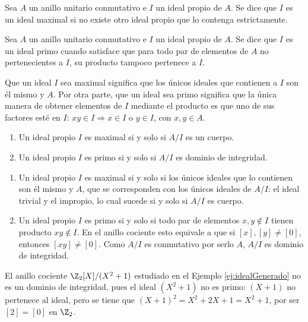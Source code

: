 \begin{deff}{\cite[p.~29]{GamboaAnillos}}
    Sea $A$ un anillo unitario conmutativo e $I$ un ideal propio de $A$. Se dice que $I$ es un ideal maximal si no existe otro ideal propio que lo contenga estrictamente. 
\end{deff}
    
\begin{deff}{\cite[p.~29]{GamboaAnillos}}
    Sea $A$ un anillo unitario conmutativo e $I$ un ideal propio de $A$. Se dice que $I$ es un ideal primo cuando satisface que para todo par de elementos de $A$ no pertenecientes a $I$, su producto tampoco pertenece a $I$.
\end{deff}

\begin{obs}
    Que un ideal $I$ sea maximal significa que los únicos ideales que contienen a $I$ son él mismo y $A$. Por otra parte, que un ideal sea primo significa que la única manera de obtener elementos de $I$ mediante el producto es que uno de sus factores esté en $I$: $xy \in I \Longrightarrow x\in I $ o $y \in I$, con $x,y\in A$.    
\end{obs}

\begin{prop}\leavevmode \vspace{-0.4\baselineskip}\label{prop:IdealmaximalCuerpo}
    \begin{enumerate}
        \item Un ideal propio $I$ es maximal si y solo si $A/I$ es un cuerpo.
        \item Un ideal propio $I$ es primo si y solo si $A/I$ es dominio de integridad.
    \end{enumerate}
\end{prop}

\begin{dem}{\cite[pp.~29-30]{GamboaAnillos}}
    \begin{enumerate}[label=\roman*)]
        \item Un ideal propio $I$ es maximal si y solo si los únicos ideales que lo contienen son él mismo y $A$, que se corresponden con los únicos ideales de $A/I$: el ideal trivial y el impropio, lo cual sucede si y solo si $A/I$ es cuerpo.
        \item Un ideal propio $I$ es primo si y solo si todo par de elementos $x,y\not\in I$ tienen producto $xy\not\in I$. En el anillo cociente esto equivale a que si $[x],[y] \neq [0]$, entonces $[xy] \neq [0]$. Como $A/I$ es conmutativo por serlo $A$, $A/I$ es dominio de integridad.
    \end{enumerate}
\end{dem}


    \begin{ejs}
        \item El anillo cociente $\Z_2[X]/(X^2+1)$ estudiado en el Ejemplo \ref{ej:idealGenerado} no es un dominio de integridad, pues el ideal $(X^2+1)$ no es primo: $(X+1)$ no pertenece al ideal, pero se tiene que $(X+1)^2 = X^2 + 2X + 1 = X^2 + 1$, por ser $[2] = [0]$ en $\Z_2$.
    \end{ejs}







